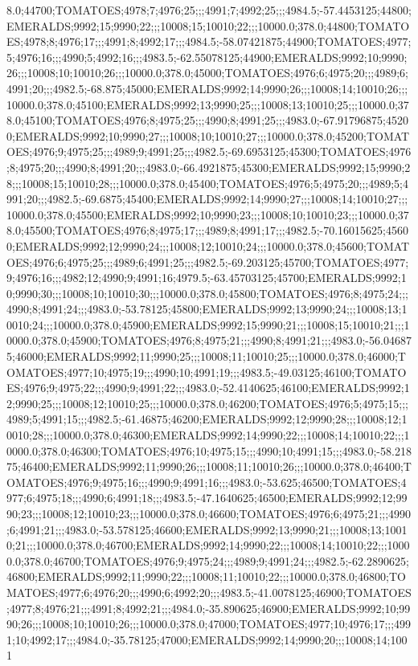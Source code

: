 8.0;44700;TOMATOES;4978;7;4976;25;;;4991;7;4992;25;;;4984.5;-57.4453125;44800;EMERALDS;9992;15;9990;22;;;10008;15;10010;22;;;10000.0;378.0;44800;TOMATOES;4978;8;4976;17;;;4991;8;4992;17;;;4984.5;-58.07421875;44900;TOMATOES;4977;5;4976;16;;;4990;5;4992;16;;;4983.5;-62.55078125;44900;EMERALDS;9992;10;9990;26;;;10008;10;10010;26;;;10000.0;378.0;45000;TOMATOES;4976;6;4975;20;;;4989;6;4991;20;;;4982.5;-68.875;45000;EMERALDS;9992;14;9990;26;;;10008;14;10010;26;;;10000.0;378.0;45100;EMERALDS;9992;13;9990;25;;;10008;13;10010;25;;;10000.0;378.0;45100;TOMATOES;4976;8;4975;25;;;4990;8;4991;25;;;4983.0;-67.91796875;45200;EMERALDS;9992;10;9990;27;;;10008;10;10010;27;;;10000.0;378.0;45200;TOMATOES;4976;9;4975;25;;;4989;9;4991;25;;;4982.5;-69.6953125;45300;TOMATOES;4976;8;4975;20;;;4990;8;4991;20;;;4983.0;-66.4921875;45300;EMERALDS;9992;15;9990;28;;;10008;15;10010;28;;;10000.0;378.0;45400;TOMATOES;4976;5;4975;20;;;4989;5;4991;20;;;4982.5;-69.6875;45400;EMERALDS;9992;14;9990;27;;;10008;14;10010;27;;;10000.0;378.0;45500;EMERALDS;9992;10;9990;23;;;10008;10;10010;23;;;10000.0;378.0;45500;TOMATOES;4976;8;4975;17;;;4989;8;4991;17;;;4982.5;-70.16015625;45600;EMERALDS;9992;12;9990;24;;;10008;12;10010;24;;;10000.0;378.0;45600;TOMATOES;4976;6;4975;25;;;4989;6;4991;25;;;4982.5;-69.203125;45700;TOMATOES;4977;9;4976;16;;;4982;12;4990;9;4991;16;4979.5;-63.45703125;45700;EMERALDS;9992;10;9990;30;;;10008;10;10010;30;;;10000.0;378.0;45800;TOMATOES;4976;8;4975;24;;;4990;8;4991;24;;;4983.0;-53.78125;45800;EMERALDS;9992;13;9990;24;;;10008;13;10010;24;;;10000.0;378.0;45900;EMERALDS;9992;15;9990;21;;;10008;15;10010;21;;;10000.0;378.0;45900;TOMATOES;4976;8;4975;21;;;4990;8;4991;21;;;4983.0;-56.046875;46000;EMERALDS;9992;11;9990;25;;;10008;11;10010;25;;;10000.0;378.0;46000;TOMATOES;4977;10;4975;19;;;4990;10;4991;19;;;4983.5;-49.03125;46100;TOMATOES;4976;9;4975;22;;;4990;9;4991;22;;;4983.0;-52.4140625;46100;EMERALDS;9992;12;9990;25;;;10008;12;10010;25;;;10000.0;378.0;46200;TOMATOES;4976;5;4975;15;;;4989;5;4991;15;;;4982.5;-61.46875;46200;EMERALDS;9992;12;9990;28;;;10008;12;10010;28;;;10000.0;378.0;46300;EMERALDS;9992;14;9990;22;;;10008;14;10010;22;;;10000.0;378.0;46300;TOMATOES;4976;10;4975;15;;;4990;10;4991;15;;;4983.0;-58.21875;46400;EMERALDS;9992;11;9990;26;;;10008;11;10010;26;;;10000.0;378.0;46400;TOMATOES;4976;9;4975;16;;;4990;9;4991;16;;;4983.0;-53.625;46500;TOMATOES;4977;6;4975;18;;;4990;6;4991;18;;;4983.5;-47.1640625;46500;EMERALDS;9992;12;9990;23;;;10008;12;10010;23;;;10000.0;378.0;46600;TOMATOES;4976;6;4975;21;;;4990;6;4991;21;;;4983.0;-53.578125;46600;EMERALDS;9992;13;9990;21;;;10008;13;10010;21;;;10000.0;378.0;46700;EMERALDS;9992;14;9990;22;;;10008;14;10010;22;;;10000.0;378.0;46700;TOMATOES;4976;9;4975;24;;;4989;9;4991;24;;;4982.5;-62.2890625;46800;EMERALDS;9992;11;9990;22;;;10008;11;10010;22;;;10000.0;378.0;46800;TOMATOES;4977;6;4976;20;;;4990;6;4992;20;;;4983.5;-41.0078125;46900;TOMATOES;4977;8;4976;21;;;4991;8;4992;21;;;4984.0;-35.890625;46900;EMERALDS;9992;10;9990;26;;;10008;10;10010;26;;;10000.0;378.0;47000;TOMATOES;4977;10;4976;17;;;4991;10;4992;17;;;4984.0;-35.78125;47000;EMERALDS;9992;14;9990;20;;;10008;14;1001